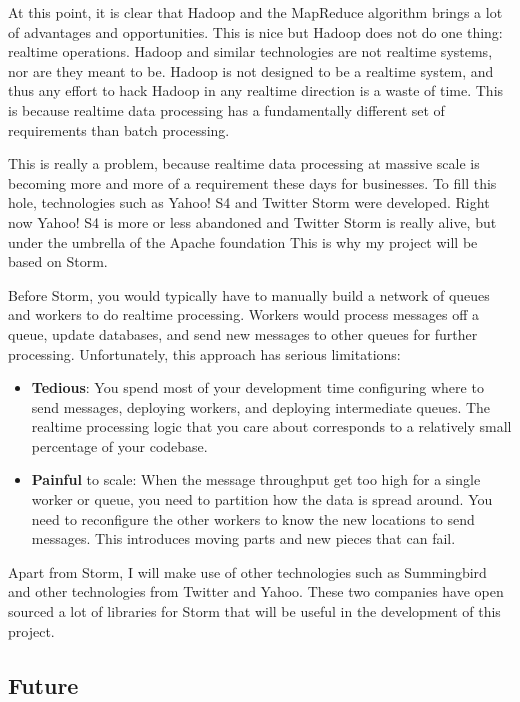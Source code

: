 \documentclass[a4paper,12pt]{article}
\newcommand{\mylist}{
\begin{itemize}
\setlength{\itemsep}{1pt}
\setlength{\parskip}{0pt}
\setlength{\parsep}{0pt}}
\newcommand{\mylistend}{\end{itemize}}
\begin{document}
At this point, it is clear that Hadoop and the MapReduce algorithm brings a lot
of advantages and opportunities. This is nice but Hadoop does not do one thing:
realtime operations. Hadoop and similar technologies are not realtime systems,
nor are they meant to be. Hadoop is not designed to be a realtime system, and
thus any effort to hack Hadoop in any realtime direction is a waste of time.
This is because realtime data processing has a fundamentally different set of
requirements than batch processing.

This is really a problem, because realtime data processing at massive scale is
becoming more and more of a requirement these days for businesses. To fill this
hole, technologies such as Yahoo! S4 and Twitter Storm\cite{storm} were
developed. Right now Yahoo! S4 is more or less abandoned and Twitter Storm is
really alive, but under the umbrella of the Apache foundation\cite{apache} This
is why my project will be based on Storm.

Before Storm, you would typically have to manually build a network of queues and
workers to do realtime processing. Workers would process messages off a queue,
update databases, and send new messages to other queues for further processing.
Unfortunately, this approach has serious limitations:

\mylist
\item {\bf Tedious}: You spend most of your development time configuring where to send
messages, deploying workers, and deploying intermediate queues. The realtime
processing logic that you care about corresponds to a relatively small
percentage of your codebase.
\item {\bf Painful} to scale: When the message throughput get too high for a single worker
or queue, you need to partition how the data is spread around. You need to
reconfigure the other workers to know the new locations to send messages. This
introduces moving parts and new pieces that can fail.
\mylistend

Apart from Storm, I will make use of other technologies such as
Summingbird\cite{summingbird} and other technologies from Twitter\cite{twitter}
and Yahoo\cite{yahoo}. These two companies have open sourced a lot of libraries
for Storm that will be useful in the development of this project.

\subsection{Future}
\end{document}
